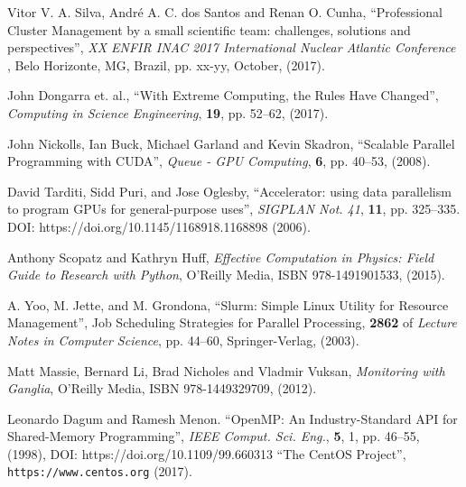 \documentclass[twoside,a4paper,12pt,english]{inac19}
\begin{document}
\begin{thebibliography}{99} %

 Vitor V. A. Silva, Andr\'{e} A. C. dos Santos and Renan O. Cunha, ``Professional Cluster Management
  by a small scientific team: challenges, solutions and perspectives'', \textit{XX ENFIR INAC 2017 International Nuclear Atlantic Conference }, Belo Horizonte, MG, Brazil, pp. xx-yy, October, (2017). 
  
  
 John Dongarra et. al., ``With Extreme Computing, the Rules Have Changed'', \textit{Computing in Science Engineering}, \textbf{19}, pp. 52--62, (2017).
  
 John Nickolls, Ian Buck, Michael Garland and Kevin Skadron, ``Scalable Parallel Programming with CUDA'', \textit{Queue - GPU Computing}, \textbf{6}, pp. 40--53, (2008).
  
 David Tarditi, Sidd Puri, and Jose Oglesby, ``Accelerator: using data parallelism to program GPUs for general-purpose uses'',  \textit{SIGPLAN Not. 41}, \textbf{11}, pp. 325--335. DOI: https://doi.org/10.1145/1168918.1168898 (2006).

 Anthony Scopatz and Kathryn Huff, \textit{Effective Computation in Physics: Field Guide to Research with Python}, O'Reilly Media, ISBN 978-1491901533, (2015).
  
 A. Yoo, M. Jette, and M. Grondona, ``Slurm: Simple Linux Utility for Resource Management'', Job Scheduling Strategies for Parallel Processing, \textbf{2862} of \textit{Lecture Notes in Computer Science}, pp. 44--60, Springer-Verlag, (2003).
  

 Matt Massie, Bernard Li, Brad Nicholes and Vladmir Vuksan, \textit{Monitoring with Ganglia}, O'Reilly Media, ISBN 978-1449329709, (2012).

   Leonardo Dagum and Ramesh Menon. ``OpenMP: An Industry-Standard API for Shared-Memory Programming'', \textit{IEEE Comput. Sci. Eng.}, \textbf{5}, 1, pp. 46--55, (1998), DOI: https://doi.org/10.1109/99.660313 
 ``The CentOS Project'', \verb#https://www.centos.org# (2017).


\end{thebibliography}
\end{document}
